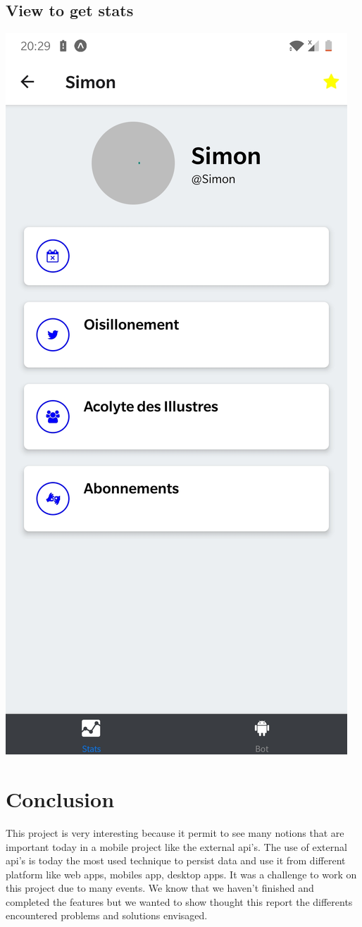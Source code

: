 \documentclass{article}
\begin{document}
\subsection{View to get stats}
\includegraphics[height=1\textheight]{profil}

\section{Conclusion}
This project is very interesting because it permit to see many notions that are important today in a mobile project like the external api's. The use of external api's is today the most used technique to persist data and use it from different platform like web apps, mobiles app, desktop apps. It was a challenge to work on this project due to many events. We know that we haven't finished and completed the features but we wanted to show thought this report the differents encountered problems and solutions envisaged.
\end{document}
